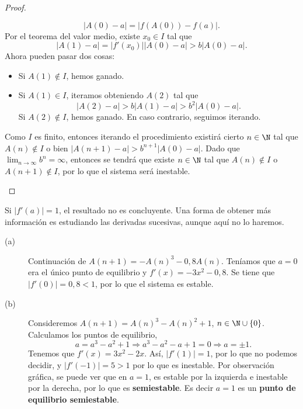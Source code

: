 \begin{proof}
\begin{description}
	\[ \left|A\left(0\right)-a\right| = \left|f\left(A\left(0\right)\right)-f\left(a\right)\right| .\]
Por el teorema del valor medio, existe $\displaystyle x_{0} \in I $ tal que 
\[ \left|A\left(1\right)-a\right| = \left|f'\left(x_{0}\right)\right| \left|A\left(0\right)-a\right| > b \left|A\left(0\right)-a\right| .\]
Ahora pueden pasar dos cosas:
\begin{itemize}
\item Si $\displaystyle A\left(1\right) \not\in I $, hemos ganado.
\item Si $\displaystyle A\left(1\right) \in I $, iteramos obteniendo $\displaystyle A\left(2\right) $ tal que
	\[ \left|A\left(2\right) - a\right| > b \left|A\left(1\right) - a\right| > b^{2} \left|A\left(0\right)-a\right| .\]
	Si $\displaystyle A\left(2\right) \not\in I $, hemos ganado. En caso contrario, seguimos iterando.
\end{itemize}
 Como $\displaystyle I $ es finito, entonces iterando el procedimiento existirá cierto $\displaystyle n \in \N $ tal que $\displaystyle A\left(n\right) \not\in I $ o bien $\displaystyle \left|A\left(n+1\right)-a\right| > b^{n+1} \left|A\left(0\right)-a\right| $. Dado que $\displaystyle \lim_{n \to \infty}b^{n}=\infty $, entonces se tendrá que existe $\displaystyle n \in \N $ tal que $\displaystyle A\left(n\right) \not\in I $ o $\displaystyle A\left(n+1\right) \not\in I $, por lo que el sistema será inestable.
\end{description}
\end{proof}
\begin{observation}
\normalfont Si $\displaystyle \left|f'\left(a\right)\right| = 1 $, el resultado no es concluyente. Una forma de obtener más información es estudiando las derivadas sucesivas, aunque aquí no lo haremos.
\end{observation}
\begin{eg}
\normalfont 
\begin{description} 
\item[(a)] Continuación de $\displaystyle A\left(n+1\right) = -A\left(n\right)^{3}-0,8A\left(n\right) $. Teníamos que $\displaystyle a=0 $ era el único punto de equilibrio y $\displaystyle f'\left(x\right) = -3x^{2}-0,8 $. Se tiene que $\displaystyle \left|f'\left(0\right)\right| = 0,8 < 1 $, por lo que el sistema es estable.
\item[(b)] Consideremos $\displaystyle A\left(n+1\right) = A\left(n\right)^{3} - A\left(n\right)^{2} + 1 $, $\displaystyle n \in \N \cup \left\{ 0\right\}  $. Calculamos los puntos de equilibrio,
	\[a = a^{3}-a^{2}+1 \Rightarrow a^{3}-a^{2}-a+1=0 \Rightarrow a = \pm 1.\]
	Tenemos que $\displaystyle f'\left(x\right) = 3x^{2}-2x $. Así, $\displaystyle \left|f'\left(1\right)\right| = 1 $, por lo que no podemos decidir, y $\displaystyle \left|f'\left(-1\right)\right| = 5 > 1 $ por lo que es inestable. Por observación gráfica, se puede ver que en $\displaystyle a = 1 $, es estable por la izquierda e inestable por la derecha, por lo que es \textbf{semiestable}. Es decir $\displaystyle a = 1 $ es un \textbf{punto de equilibrio semiestable}.
\end{description}
\end{eg}
